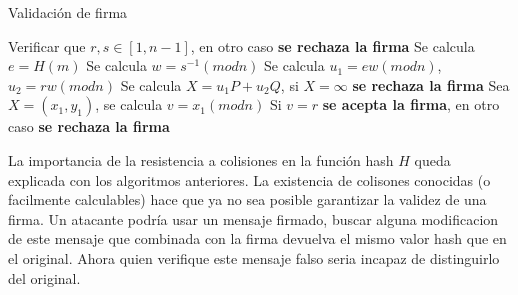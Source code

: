 \begin{algorithm}
\caption{Validación de firma}\label{alg:verificar}
\begin{algorithmic}[1]
\State Verificar que $r,s \in [1, n-1]$, en otro caso \textbf{se rechaza la firma}
\State Se calcula $e = H(m)$
\State Se calcula $w = s^{-1} (mod n)$
\State Se calcula $u_{1} = ew (mod n)$, $u_{2} = rw (mod n)$
\State Se calcula $X = u_{1}P + u_{2}Q$, si $X=\infty$ \textbf{se rechaza la firma} 
\State Sea $X = (x_{1},y_{1})$, se calcula $v = x_{1} (mod n)$
\State Si $v = r$ \textbf{se acepta la firma}, en otro caso \textbf{se rechaza la firma}
\end{algorithmic}
\end{algorithm}

La importancia de la resistencia a colisiones en la función hash $H$ queda explicada con los algoritmos anteriores.
La existencia de colisones conocidas (o facilmente calculables) hace que ya no sea posible garantizar la validez de una firma. Un atacante podría usar un mensaje firmado, buscar alguna modificacion de este mensaje que combinada con la firma devuelva el mismo valor hash que en el original. Ahora quien verifique este mensaje falso seria incapaz de distinguirlo del original.



